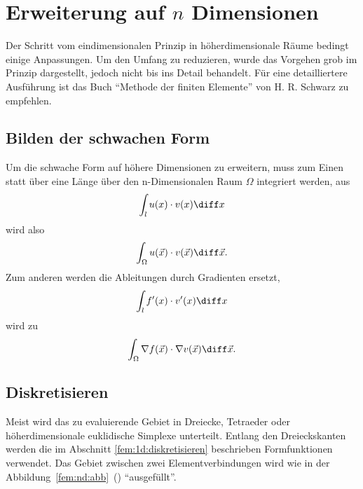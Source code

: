 %
%
%
%
\section{Erweiterung auf $n$ Dimensionen\label{fem:nD}}
Der Schritt vom eindimensionalen Prinzip in höherdimensionale Räume bedingt einige Anpassungen. 
Um den Umfang zu reduzieren, wurde das Vorgehen grob im Prinzip dargestellt, jedoch nicht bis ins Detail behandelt.
Für eine detailliertere Ausführung ist das Buch ``Methode der finiten Elemente'' \cite{fem:bib:methode_der_finiten_elemente} von H. R. Schwarz zu empfehlen.


\subsection{Bilden der schwachen Form}
Um die schwache Form auf höhere Dimensionen zu erweitern, muss zum Einen statt über eine Länge über den n-Dimensionalen Raum $\Omega$ integriert werden, aus 
\begin{equation*}
    \int_{l} u(x) \cdot v(x) \diff x
\end{equation*}
wird also
\begin{equation*}
    \int_{\Omega} u(\vec{x}) \cdot v(\vec{x}) \diff \vec{x}.
\end{equation*}
Zum anderen werden die Ableitungen durch Gradienten ersetzt,
\begin{equation*}
    \int_{l} f'(x) \cdot v'(x) \diff x
\end{equation*}
wird zu
\begin{equation*}
    \int_{\Omega} \nabla f(\vec{x}) \cdot \nabla v(\vec{x}) \diff \vec{x}.
\end{equation*}


\subsection{Diskretisieren}
Meist wird das zu evaluierende Gebiet in Dreiecke, Tetraeder oder höherdimensionale euklidische Simplexe unterteilt. 
Entlang den Dreieckskanten werden die im Abschnitt \ref{fem:1d:diskretisieren} beschrieben Formfunktionen verwendet.
Das Gebiet zwischen zwei Elementverbindungen wird wie in der Abbildung~\ref{fem:nd:abb}~() ``ausgefüllt''.
%


